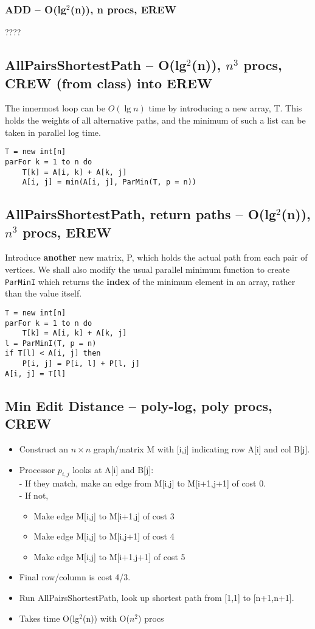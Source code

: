 \documentclass[12pt]{article}
\providecommand{\tightlist}{
    \setlength{\itemsep}{0pt}\setlength{\parskip}{0pt}
}
\begin{document}
\subsubsection{ADD -- O(lg$^2$(n)), n procs, EREW}
????


\subsection{AllPairsShortestPath -- O(lg$^2$(n)), $n^3$ procs, CREW (from class) into EREW}
The innermost loop can be $O(\lg n)$ time by introducing a new array, T.
This holds the weights of all alternative paths, and the minimum of such a list can be taken in parallel log time.
\begin{lstlisting}
T = new int[n]
parFor k = 1 to n do
    T[k] = A[i, k] + A[k, j]
    A[i, j] = min(A[i, j], ParMin(T, p = n))
\end{lstlisting}

\subsection{AllPairsShortestPath, return paths -- O(lg$^2$(n)), $n^3$ procs, EREW}
Introduce \textbf{another} new matrix, P, which holds the actual path from each pair of vertices.
We shall also modify the usual parallel minimum function to create \texttt{ParMinI} which returns the \textbf{index} of the minimum element in an array, rather than the value itself.
\begin{lstlisting}
T = new int[n]
parFor k = 1 to n do
    T[k] = A[i, k] + A[k, j]
l = ParMinI(T, p = n)
if T[l] < A[i, j] then
    P[i, j] = P[i, l] + P[l, j]
A[i, j] = T[l]
\end{lstlisting}


\subsection{Min Edit Distance -- poly-log, poly procs, CREW}
\begin{itemize}\tightlist
  \item Construct an $n\times n$ graph/matrix M with [i,j] indicating row A[i] and col B[j].
  \item Processor $p_{i,j}$ looks at A[i] and B[j]:\\
    -  If they match, make an edge from M[i,j] to M[i+1,j+1] of cost 0.\\
    -  If not,
    \begin{itemize}\tightlist
      \item Make edge M[i,j] to M[i+1,j] of cost 3
      \item Make edge M[i,j] to M[i,j+1] of cost 4
      \item Make edge M[i,j] to M[i+1,j+1] of cost 5
    \end{itemize}
  \item Final row/column is cost 4/3.
  \item Run AllPairsShortestPath, look up shortest path from [1,1] to [n+1,n+1].
  \item Takes time O(lg$^2$(n)) with O($n^2$) procs
\end{itemize}
\end{document}
